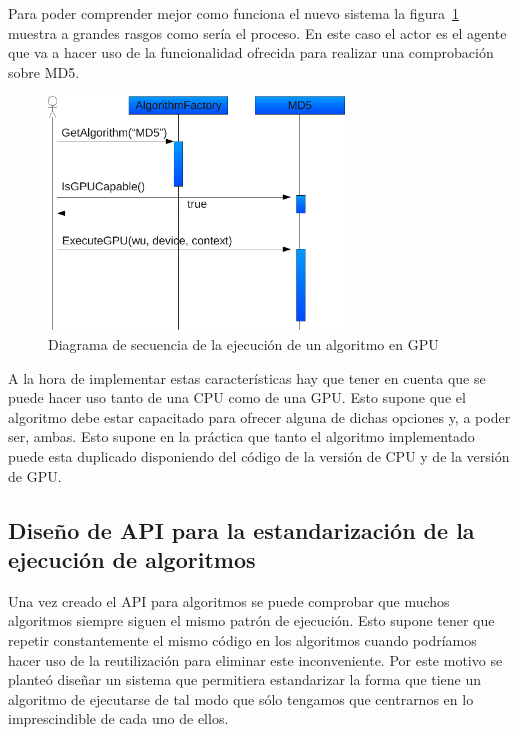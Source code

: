 Para poder comprender mejor como funciona el nuevo sistema la figura~\ref{fig:algotirmo_gpu} muestra a grandes rasgos como sería el proceso. En este caso el actor es el agente que va a hacer uso de la funcionalidad ofrecida para realizar una comprobación sobre MD5.

\begin{figure}
	\centering
	\includegraphics[width=0.7\textwidth]{images/algoritmo_gpu.pdf}
	\caption{Diagrama de secuencia de la ejecución de un algoritmo en GPU}\label{fig:algotirmo_gpu}
\end{figure}

A la hora de implementar estas características hay que tener en cuenta que se puede hacer uso tanto de una CPU como de una GPU. Esto supone que el algoritmo debe estar capacitado para ofrecer alguna de dichas opciones y, a poder ser, ambas. Esto supone en la práctica que tanto el algoritmo implementado puede esta duplicado disponiendo del código de la versión de CPU y de la versión de GPU.



\subsection{Diseño de API para la estandarización de la ejecución de algoritmos}

Una vez creado el API para algoritmos se puede comprobar que muchos algoritmos siempre siguen el mismo patrón de ejecución. Esto supone tener que repetir constantemente el mismo código en los algoritmos cuando podríamos hacer uso de la reutilización para eliminar este inconveniente. Por este motivo se planteó diseñar un sistema que permitiera estandarizar la forma que tiene un algoritmo de ejecutarse de tal modo que sólo tengamos que centrarnos en lo imprescindible de cada uno de ellos.

